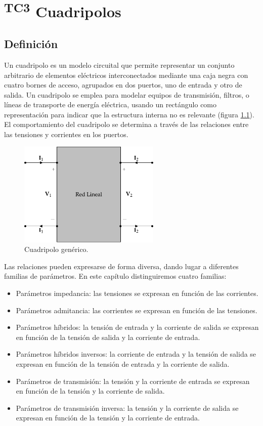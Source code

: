 \chapter{\textsuperscript{TC3} Cuadripolos}\label{chap:cuadripolos}
\section{Definición}

Un cuadripolo es un modelo circuital que permite representar un conjunto arbitrario de elementos eléctricos interconectados mediante una caja negra con cuatro bornes de acceso, agrupados en dos puertos, uno de entrada y otro de salida. Un cuadripolo se emplea para modelar equipos de transmisión, filtros, o líneas de transporte de energía eléctrica, usando un rectángulo como representación para indicar que la estructura interna no es relevante (figura \ref{fig:cuadripolo}). El comportamiento del cuadripolo se determina a través de las relaciones entre las tensiones y corrientes en los puertos. 


\begin{figure}[H]
  \centering
  \includegraphics[height=5cm]{../figs/cuadripolo.pdf}
  \caption{Cuadripolo genérico.}
  \label{fig:cuadripolo}
\end{figure}

Las relaciones pueden expresarse de forma diversa, dando lugar a diferentes familias de parámetros. En este capítulo distinguiremos cuatro familias:
\begin{itemize}
\item Parámetros impedancia: las tensiones se expresan en función de las corrientes.
\item Parámetros admitancia: las corrientes se expresan en función de las tensiones.
\item Parámetros híbridos: la tensión de entrada y la corriente de salida se expresan en función de la tensión de salida y la corriente de entrada.
\item Parámetros híbridos inversos: la corriente de entrada y la tensión de salida se expresan en función de la tensión de entrada y la corriente de salida.
\item Parámetros de transmisión: la tensión y la corriente de entrada se expresan en función de la tensión y la corriente de salida.
\item Parámetros de transmisión inversa: la tensión y la corriente de salida se expresan en función de la tensión y la corriente de entrada.
\end{itemize}

